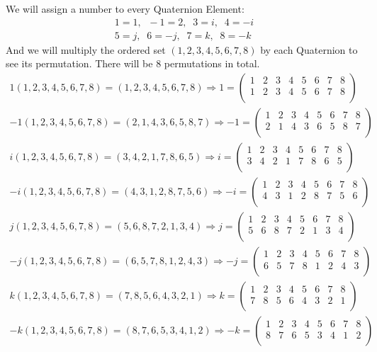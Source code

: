 \documentclass[]{scrartcl}
\begin{document}
We will assign a number to every Quaternion Element:
\begin{gather*}
	1 = 1,\;\; -1 = 2,\;\; 3 = i,\;\; 4 = -i\\
	5 = j,\;\; 6 = -j,\;\; 7 = k,\;\; 8 = -k
\end{gather*}
And we will multiply the ordered set $(1,2,3,4,5,6,7,8)$ by each Quaternion to see its permutation. There will be 8 permutations in total.
\begin{gather*}
	1(1,2,3,4,5,6,7,8) = (1,2,3,4,5,6,7,8) \Rightarrow 1 =
	\begin{pmatrix}
		1 & 2 & 3 & 4 & 5 & 6 & 7 & 8\\
		1 & 2 & 3 & 4 & 5 & 6 & 7 & 8\\
	\end{pmatrix}\\
	-1(1,2,3,4,5,6,7,8) = (2,1,4,3,6,5,8,7) \Rightarrow -1 =
	\begin{pmatrix}
		1 & 2 & 3 & 4 & 5 & 6 & 7 & 8\\
		2 & 1 & 4 & 3 & 6 & 5 & 8 & 7\\
	\end{pmatrix}\\
	i(1,2,3,4,5,6,7,8) = (3,4,2,1,7,8,6,5) \Rightarrow i = 
	\begin{pmatrix}
		1 & 2 & 3 & 4 & 5 & 6 & 7 & 8\\
		3 & 4 & 2 & 1 & 7 & 8 & 6 & 5\\
	\end{pmatrix}\\
	-i(1,2,3,4,5,6,7,8) = (4,3,1,2,8,7,5,6) \Rightarrow -i =
	\begin{pmatrix}
		1 & 2 & 3 & 4 & 5 & 6 & 7 & 8\\
		4 & 3 & 1 & 2 & 8 & 7 & 5 & 6\\
	\end{pmatrix}\\
	j(1,2,3,4,5,6,7,8) = (5,6,8,7,2,1,3,4) \Rightarrow j =
	\begin{pmatrix}
		1 & 2 & 3 & 4 & 5 & 6 & 7 & 8\\
		5 & 6 & 8 & 7 & 2 & 1 & 3 & 4\\
	\end{pmatrix}\\
	-j(1,2,3,4,5,6,7,8) = (6,5,7,8,1,2,4,3) \Rightarrow -j =
	\begin{pmatrix}
		1 & 2 & 3 & 4 & 5 & 6 & 7 & 8\\
		6 & 5 & 7 & 8 & 1 & 2 & 4 & 3\\
	\end{pmatrix}\\
	k(1,2,3,4,5,6,7,8) = (7,8,5,6,4,3,2,1) \Rightarrow k =
	\begin{pmatrix}
		1 & 2 & 3 & 4 & 5 & 6 & 7 & 8\\
		7 & 8 & 5 & 6 & 4 & 3 & 2 & 1\\
	\end{pmatrix}\\
	-k(1,2,3,4,5,6,7,8) = (8,7,6,5,3,4,1,2) \Rightarrow -k=
	\begin{pmatrix}
		1 & 2 & 3 & 4 & 5 & 6 & 7 & 8\\
		8 & 7 & 6 & 5 & 3 & 4 & 1 & 2\\
	\end{pmatrix}		
\end{gather*}
\end{document}
